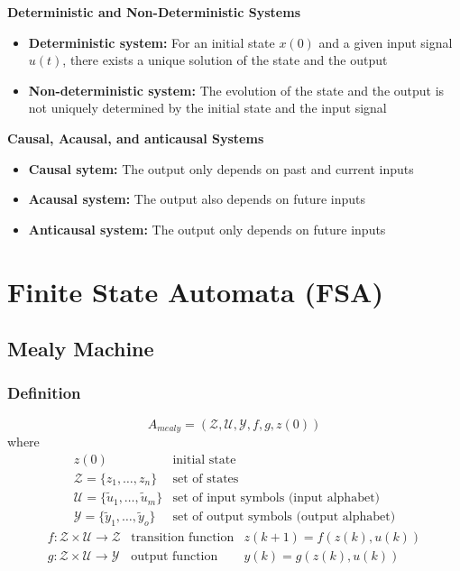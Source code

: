 \documentclass[10pt,a4paper]{article}
\begin{document}
\textbf{Deterministic and Non-Deterministic Systems}
\begin{itemize}
	\item \textbf{Deterministic system:} For an initial state $x(0)$ and a given input signal $u(t)$, there exists a unique solution of the state and the output
	\item \textbf{Non-deterministic system:} The evolution of the state and the output is not uniquely determined by the initial state and the input signal
\end{itemize}

\textbf{Causal, Acausal, and anticausal Systems}
\begin{itemize}
	\item \textbf{Causal sytem:} The output only depends on past and current inputs
	\item \textbf{Acausal system:} The output also depends on future inputs
	\item \textbf{Anticausal system:} The output only depends on future inputs
\end{itemize}




\section{Finite State Automata (FSA)}
\subsection{Mealy Machine}
\subsubsection{Definition}
$$
	A_{mealy} = (\mathcal Z, \mathcal U, \mathcal Y, f, g, z(0))
$$ where
$$
	\begin{array}{ll}
	z(0) & \text{initial state} \\
	\mathcal Z = \{z_1, \dots, z_n\} & \text{set of states} \\
	\mathcal U = \{\tilde{u}_1, \dots, \tilde{u}_m\} & \text{set of input symbols (input alphabet)} \\
	\mathcal Y = \{\tilde y_1, \dots, \tilde y_o\} & \text{set of output symbols (output alphabet)}
	\end{array}
$$
$$
	\begin{array}{lll}
	f : \mathcal Z \times \mathcal U → \mathcal Z & \text{transition function} & z(k + 1) = f(z(k), u(k)) \\
	g : \mathcal Z \times \mathcal U → \mathcal Y & \text{output function} & y(k) = g(z(k), u(k)) \\
	\end{array}
$$
\end{document}
